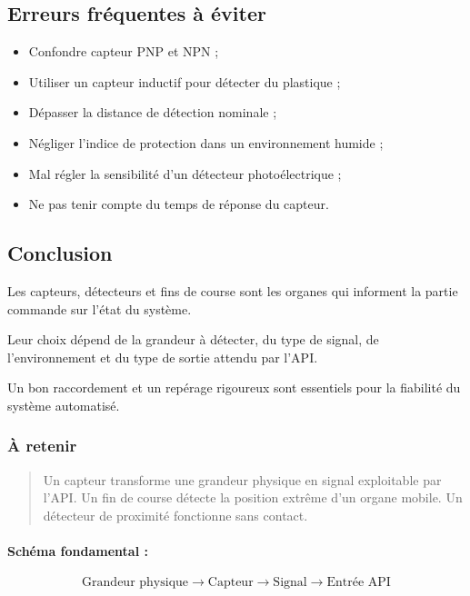\subsection{Erreurs fréquentes à éviter}

\begin{itemize}
    \item Confondre capteur PNP et NPN ;
    \item Utiliser un capteur inductif pour détecter du plastique ;
    \item Dépasser la distance de détection nominale ;
    \item Négliger l'indice de protection dans un environnement humide ;
    \item Mal régler la sensibilité d'un détecteur photoélectrique ;
    \item Ne pas tenir compte du temps de réponse du capteur.
\end{itemize}

\subsection{Conclusion}

Les capteurs, détecteurs et fins de course sont les organes qui informent la partie commande sur l'état du système.

Leur choix dépend de la grandeur à détecter, du type de signal, de l'environnement et du type de sortie attendu par l'API.

Un bon raccordement et un repérage rigoureux sont essentiels pour la fiabilité du système automatisé.

\subsubsection*{À retenir}

\begin{quote}
Un capteur transforme une grandeur physique en signal exploitable par l'API. Un fin de course détecte la position extrême d'un organe mobile. Un détecteur de proximité fonctionne sans contact.
\end{quote}

\paragraph{Schéma fondamental :}

\[
\text{Grandeur physique} \rightarrow \text{Capteur} \rightarrow \text{Signal} \rightarrow \text{Entrée API}
\]